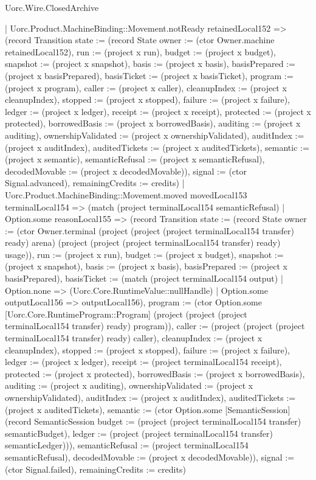 \begin{lexlean}{Uorc.Wire.ClosedArchive}
\begin{semanticmodule}
{      | Uorc.Product.MachineBinding::Movement.notReady retainedLocal152 => (record Transition {state := (record State {owner := (ctor Owner.machine retainedLocal152), run := (project x run), budget := (project x budget), snapshot := (project x snapshot), basis := (project x basis), basisPrepared := (project x basisPrepared), basisTicket := (project x basisTicket), program := (project x program), caller := (project x caller), cleanupIndex := (project x cleanupIndex), stopped := (project x stopped), failure := (project x failure), ledger := (project x ledger), receipt := (project x receipt), protected := (project x protected), borrowedBasis := (project x borrowedBasis), auditing := (project x auditing), ownershipValidated := (project x ownershipValidated), auditIndex := (project x auditIndex), auditedTickets := (project x auditedTickets), semantic := (project x semantic), semanticRefusal := (project x semanticRefusal), decodedMovable := (project x decodedMovable)}), signal := (ctor Signal.advanced), remainingCredits := credits})
      | Uorc.Product.MachineBinding::Movement.moved movedLocal153 terminalLocal154 => (match (project terminalLocal154 semanticRefusal)
        | Option.some reasonLocal155 => (record Transition {state := (record State {owner := (ctor Owner.terminal (project (project (project terminalLocal154 transfer) ready) arena) (project (project (project terminalLocal154 transfer) ready) usage)), run := (project x run), budget := (project x budget), snapshot := (project x snapshot), basis := (project x basis), basisPrepared := (project x basisPrepared), basisTicket := (match (project terminalLocal154 output)
          | Option.none => (Uorc.Core.RuntimeValue::nullHandle)
          | Option.some outputLocal156 => outputLocal156), program := (ctor Option.some [Uorc.Core.RuntimeProgram::Program] (project (project (project terminalLocal154 transfer) ready) program)), caller := (project (project (project terminalLocal154 transfer) ready) caller), cleanupIndex := (project x cleanupIndex), stopped := (project x stopped), failure := (project x failure), ledger := (project x ledger), receipt := (project terminalLocal154 receipt), protected := (project x protected), borrowedBasis := (project x borrowedBasis), auditing := (project x auditing), ownershipValidated := (project x ownershipValidated), auditIndex := (project x auditIndex), auditedTickets := (project x auditedTickets), semantic := (ctor Option.some [SemanticSession] (record SemanticSession {budget := (project (project terminalLocal154 transfer) semanticBudget), ledger := (project (project terminalLocal154 transfer) semanticLedger)})), semanticRefusal := (project terminalLocal154 semanticRefusal), decodedMovable := (project x decodedMovable)}), signal := (ctor Signal.failed), remainingCredits := credits})
}
\end{semanticmodule}
\end{lexlean}
